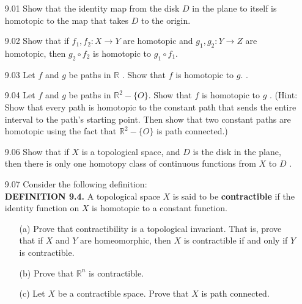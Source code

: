 \documentclass[12pt]{article}
\begin{document}
	\pagestyle{fancy}  
	\lfoot{} \cfoot{} \rfoot{}
	
	\begin{enumerate}
		\item[9.01] Show that the identity map from the disk $D$ in the plane to itself is homotopic to the map that takes $D$ to the origin.
		
		\item[9.02] Show that if $f _ { 1 } , f _ { 2 } : X \rightarrow Y$ are homotopic and $g _ { 1 } , g _ { 2 } : Y \rightarrow Z$ are homotopic,
		then $g _ { 2 } \circ f _ { 2 }$ is homotopic to $g _ { 1 } \circ f _ { 1 } .$
		
		\item[9.03] Let $f$ and $g$ be paths in $\mathbb { R }$ . Show that $f$ is homotopic to $g .$ .
		
		\item[9.04] Let $f$ and $g$ be paths in $\mathbb { R } ^ { 2 } - \{ O \} .$ Show that $f$ is homotopic to $g$ . (Hint: Show
		that every path is homotopic to the constant path that sends the entire interval
		to the path's starting point. Then show that two constant paths are homotopic
		using the fact that $\mathbb { R } ^ { 2 } - \{ O \}$ is path connected.)
		
		\item[9.06] Show that if $X$ is a topological space, and $D$ is the disk in the plane, then there is only one homotopy class of continuous functions from $X$ to $D$ .
		
		\item[9.07] Consider the following definition:\medskip\\
		\textbf{DEFINITION 9.4.} A topological space $X$ is said to be \textbf{contractible} if the
		identity function on $X$ is homotopic to a constant function.
		
		\begin{enumerate}
			\item[(a)] Prove that contractibility is a topological invariant. That is, prove that if
			$X$ and $Y$ are homeomorphic, then $X$ is contractible if and only if $Y$ is
			contractible.
			
			\item[(b)] Prove that $\mathbb { R } ^ { n }$ is contractible.
			
			\item[(c)] Let $X$ be a contractible space. Prove that $X$ is path connected.
			

\end{enumerate}
\end{enumerate}
\end{document}
